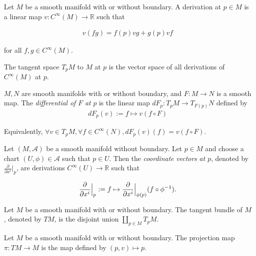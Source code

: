 \begin{defn}[Derivation]
  Let $M$ be a smooth manifold with or without boundary.
  A derivation at $p \in M$ is a linear map $v: C^{\infty}(M) \rightarrow \mathbb{R}$ such that 

  \begin{align*}
    v(fg) = f(p)vg + g(p)vf
  \end{align*}

  for all $f, g \in C^{\infty}(M)$.
\end{defn}

\begin{defn}
  The tangent space $T_pM$ to $M$ at $p$ is the vector space of all derivations of $C^{\infty}(M)$ at $p$.
\end{defn}

\begin{defn}[Differential]
  $M, N$ are smooth manifolds with or without boundary, and $F: M \rightarrow N$ is a smooth map.
  The \textit{differential of $F$ at $p$} is the linear map $dF_p: T_pM \rightarrow T_{F(p)}N$ defined by 
  \begin{align*}
    dF_p(v) := f \mapsto v(f \circ F)
  \end{align*}

  Equivalently, $\forall v \in T_pM, \forall f \in C^{\infty}(N), dF_p(v)(f) = v(f \circ F)$.
\end{defn}

\begin{defn}
  Let $(M, \mathcal{A})$ be a smooth manifold without boundary.
  Let $p \in M$ and choose a chart $(U, \phi) \in \mathcal{A}$ such that $p \in U$.
  Then the \textit{coordinate vectors at $p$}, denoted by $\frac{\partial}{\partial x^i}\vert_p$, are derivations $C^{\infty}(U) \rightarrow \mathbb{R}$ such that

  \begin{align*}
    \frac{\partial}{\partial x^i}\Big{\vert}_p := f \mapsto \frac{\partial}{\partial x^i}\Big{\vert}_{\phi(p)}(f \circ \phi^{-1}).
  \end{align*}
\end{defn}

\begin{defn}
  Let $M$ be a smooth manifold with or without boundary.
  The tangent bundle of $M$, denoted by $TM$, is the disjoint union $\coprod_{p \in M} T_pM$.
\end{defn}

\begin{defn}
  Let $M$ be a smooth manifold with or without boundary.
  The projection map $\pi: TM \rightarrow M$ is the map defined by $(p, v) \mapsto p$.
\end{defn}

